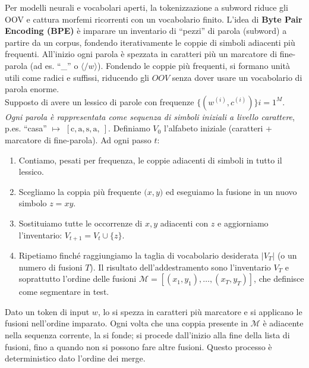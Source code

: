             Per modelli neurali e vocabolari aperti, la tokenizzazione a subword riduce gli OOV e cattura morfemi ricorrenti con un vocabolario finito. L’idea di \textbf{Byte Pair Encoding (BPE)} è imparare un inventario di “pezzi” di parola (subword) a partire da un corpus, fondendo iterativamente le coppie di simboli adiacenti più frequenti. All’inizio ogni parola è spezzata in caratteri più un marcatore di fine-parola (ad es. “\_” o $\langle/\!w\rangle$). Fondendo le coppie più frequenti, si formano unità utili come radici e suffissi, riducendo gli $OOV$ senza dover usare un vocabolario di parola enorme.\\

            Supposto di avere un lessico di parole con frequenze $\{(w^{(i)}, c^{(i)})\}{i=1}^M$. \textit{Ogni parola è rappresentata come sequenza di simboli iniziali a livello carattere}, p.es. “casa” $\mapsto$ $[\text{c},\text{a},\text{s},\text{a},\ ]$. Definiamo $V_0$ l’alfabeto iniziale (caratteri + marcatore di fine-parola). Ad ogni passo $t$:

            \begin{enumerate}
            
                \item Contiamo, pesati per frequenza, le coppie adiacenti di simboli in tutto il lessico.
                
                \item Scegliamo la coppia più frequente $\big( x,y\big)$ ed eseguiamo la fusione in un nuovo simbolo $z=xy$.
                
                \item Sostituiamo tutte le occorrenze di $x,y$ adiacenti con $z$ e aggiorniamo l’inventario: $V_{t+1}=V_t\cup\{z\}$.
                
                \item Ripetiamo finché raggiungiamo la taglia di vocabolario desiderata $|V_T|$ (o un numero di fusioni $T$). Il risultato dell’addestramento sono l’inventario $V_T$ e soprattutto l’ordine delle fusioni $\mathcal{M}=[(x_1,y_1),\dots,(x_T,y_T)]$, che definisce come segmentare in test.
                
            \end{enumerate}

            Dato un token di input $w$, lo si spezza in caratteri più marcatore e si applicano le fusioni nell’ordine imparato. Ogni volta che una coppia presente in $\mathcal{M}$ è adiacente nella sequenza corrente, la si fonde; si procede dall’inizio alla fine della lista di fusioni, fino a quando non si possono fare altre fusioni. Questo processo è deterministico dato l’ordine dei merge.

